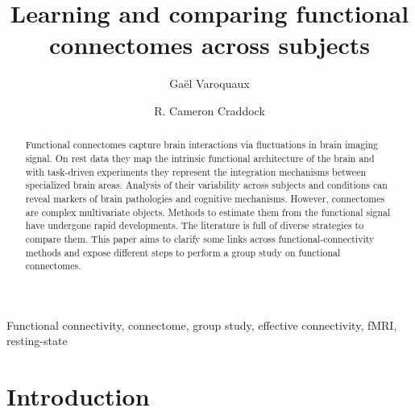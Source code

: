 \documentclass[5p]{elsarticle}
\begin{document}
\title{Learning and comparing functional connectomes across subjects}


\author[parietal,unicog,cea]{Ga\"el Varoquaux}
\author[cmi,nki]{R. Cameron Craddock}


\address[parietal]{Parietal project-team, INRIA Saclay-\^ile de France}
\address[unicog]{INSERM, U992}
\address[cea]{CEA/Neurospin b\^at 145, 91191 Gif-Sur-Yvette}
\address[cmi]{Child Mind Institute, New York, New York}
\address[nki]{Nathan Kline Institute for Psychiatric Research, Orangeburg, New York}

\begin{abstract}
    Functional connectomes capture brain interactions via 
    fluctuations in brain imaging signal. On rest data they map
    the intrinsic functional architecture of the brain and with
    task-driven experiments they represent the integration mechanisms
    between specialized brain areas. Analysis of their variability 
    across subjects and conditions can reveal markers of brain
    pathologies and cognitive mechanisms. However, connectomes are
    complex multivariate objects. Methods to estimate them 
    from the functional signal have undergone rapid developments.
    The literature is full of diverse strategies to compare them.
    This paper aims to clarify some links across functional-connectivity
    methods and expose different steps to perform a group study on
    functional connectomes.
\end{abstract}

\begin{keyword}
    Functional connectivity, connectome, group study, effective
    connectivity, fMRI, resting-state
\end{keyword}

\maketitle

\sloppy %

\section{Introduction}
\end{document}
